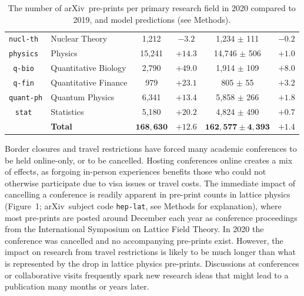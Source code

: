 \documentclass[a4paper,12pt]{article}
\newcommand{\arxiv}{arXiv}
\begin{document}
\begin{table}
\begin{center}
\begin{tabular}{|c|l|c|c|c|c|}
\texttt{nucl-th }    & Nuclear Theory         & 1,212     & $ -3.2$ & 1,234 $\pm$ 111       & $-0.2$ \\
\texttt{physics }    & Physics                & 15,241    & $+14.3$ & 14,746 $\pm$ 506      & $+1.0$ \\
\texttt{q-bio   }    & Quantitative Biology   & 2,790     & $+49.0$ & 1,914 $\pm$ 109       & $+8.0$ \\
\texttt{q-fin   }    & Quantitative Finance   & 979       & $+23.1$ & 805 $\pm$ 55          & $+3.2$ \\
\texttt{quant-ph}    & Quantum Physics        & 6,341     & $+13.4$ & 5,858 $\pm$ 266       & $+1.8$ \\
\texttt{stat    }    & Statistics             & 5,180     & $+20.2$ & 4,824 $\pm$ 490       & $+0.7$ \\
\hline
&\cellcolor{gray!25}\textbf{Total} & \cellcolor{gray!25}$\mathbf{168{,}630}$ & \cellcolor{gray!25}$\mathbf{+12.6}$ & \cellcolor{gray!25}$\mathbf{162{,}577 \pm 4{,}393}$ \cellcolor{gray!25}& \cellcolor{gray!25}$\mathbf{+1.4}$ \\
\hline 
    \end{tabular}
       \caption{The number of \arxiv\ pre-prints per primary research field in 2020 compared to 2019, and model predictions (see Methods).}
  \end{center}
\end{table}

Border closures and travel restrictions have forced many academic conferences to be held online-only, or to be cancelled. Hosting conferences online creates a mix of effects, as forgoing in-person experiences benefits those who could not otherwise participate due to visa issues or travel costs\cite{Guinnessy:2021}. The immediate impact of cancelling a conference is readily apparent in pre-print counts in lattice physics (Figure~1; \arxiv\ subject code \texttt{hep-lat}, see Methods for explanation), where most pre-prints are posted around December each year as conference proceedings from the International Symposium on Lattice Field Theory. In 2020 the conference was cancelled\cite{LatticeConferenceWebsite} and no accompanying pre-prints exist. However, the impact on research from travel restrictions is likely to be much longer than what is represented by the drop in lattice physics pre-prints. Discussions at conferences or collaborative visits frequently spark new research ideas that might lead to a publication many months or years later. 
\end{document}
